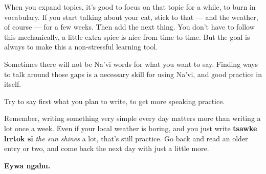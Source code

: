 \documentclass[nofonts]{tufte-handout}
\newcommand{\N}[1]{\textbf{\textcolor{navi}{#1}}}
\begin{document}
When you expand topics, it's good to focus on that topic for a while,
to burn in vocabulary.  If you start talking about your cat, stick to
that — and the weather, of course — for a few weeks.  Then add the
next thing.  You don't have to follow this mechanically, a little
extra spice is nice from time to time.  But the goal is always to make
this a non-stressful learning tool.

Sometimes there will not be Na'vi words for what you want to say.
Finding ways to talk around those gaps is a necessary skill for using
Na'vi, and good practice in itself.

Try to say first what you plan to write, to get more speaking
practice.

Remember, writing something very simple every day matters more than
writing a lot once a week.  Even if your local weather is boring, 
and you just write \N{tsawke lrrtok si} \textit{the sun shines} a lot,
that's still practice.  Go back and read an older entry or two, and
come back the next day with just a little more.


\bigskip
\N{Eywa ngahu.}
\end{document}
